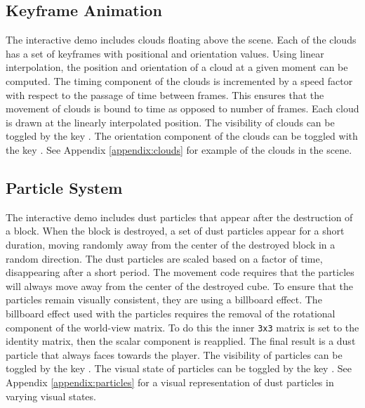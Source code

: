 \documentclass[a4paper,11pt,titlepage]{scrartcl}
\begin{document}
\subsection{Keyframe Animation}
\label{section:animation}
The interactive demo includes clouds floating above the scene.  Each of the clouds has a set of keyframes with positional and orientation values.  Using linear interpolation, the position and orientation of a cloud at a given moment can be computed.  The timing component of the clouds is incremented by a speed factor with respect to the passage of time between frames.  This ensures that the movement of clouds is bound to time as opposed to number of frames.  Each cloud is drawn at the linearly interpolated position.
\vskip 2.5mm\noindent
The visibility of clouds can be toggled by the key .  The orientation component of the clouds can be toggled with the key .  See Appendix \ref{appendix:clouds} for example of the clouds in the scene.

\subsection{Particle System}
\label{section:particles}
The interactive demo includes dust particles that appear after the destruction of a block.  When the block is destroyed, a set of dust particles appear for a short duration, moving randomly away from the center of the destroyed block in a random direction.  The dust particles are scaled based on a factor of time, disappearing after a short period.  The movement code requires that the particles will always move away from the center of the destroyed cube.  To ensure that the particles remain visually consistent, they are using a billboard effect.  The billboard effect used with the particles requires the removal of the rotational component of the world-view matrix.  To do this the inner \texttt{3x3} matrix is set to the identity matrix, then the scalar component is reapplied.  The final result is a dust particle that always faces towards the player.
\vskip 2.5mm\noindent
The visibility of particles can be toggled by the key .  The visual state of particles can be toggled by the key .  See Appendix \ref{appendix:particles} for a visual representation of dust particles in varying visual states.
\end{document}
